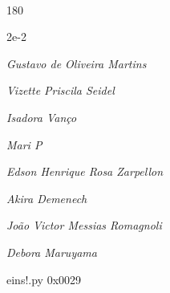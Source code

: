 \documentclass[12pt]{article}
\begin{document}
	\hfill	  	  


\pagebreak			

	\ 
	\vfill
	\begin{turn}{180}	
		\begin{minipage}{\textwidth}
		  	\ttfamily %
			\centering
			{\Huge 2e-2}
		  
			\hfill
		  
			

\textit{\small Gustavo de Oliveira Martins}

\textit{\small Vizette Priscila Seidel}

\textit{\small Isadora Vanço}

\textit{\small Mari P}

\textit{\small Edson Henrique Rosa Zarpellon}

\textit{\small Akira Demenech}

\textit{\small João Victor Messias Romagnoli}

\textit{\small Debora Maruyama}

\bigskip

eins!.py
0x0029


		\end{minipage}	
	\end{turn}
	\vfill
	\

\pagebreak
\end{document}

